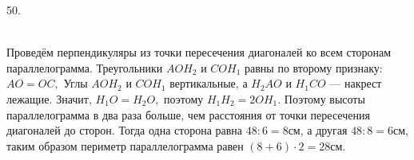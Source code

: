 50. \begin{figure}[ht!]
\end{figure}\\
Проведём перпендикуляры из точки пересечения диагоналей ко всем сторонам параллелограмма. Треугольники $AOH_2$ и $COH_1$ равны по второму признаку: $AO=OC,$ Углы $AOH_2$ и $COH_1$ вертикальные, а $H_2AO$ и $H_1CO$ --- накрест лежащие. Значит, $H_1O=H_2O,$ поэтому $H_1H_2=2OH_1.$ Поэтому высоты параллелограмма в два раза больше, чем расстояния от точки пересечения диагоналей до сторон. Тогда одна сторона равна $48:6=8$см, а другая $48:8=6$см, таким образом периметр параллелограмма равен $(8+6)\cdot2=28$см.\\
